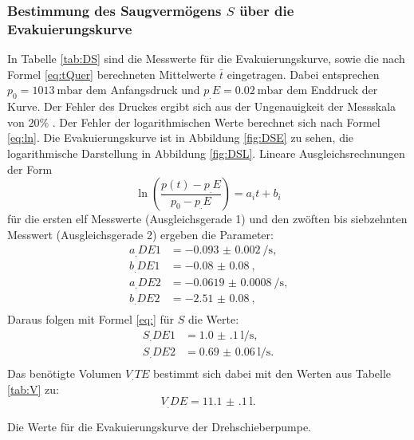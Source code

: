\subsubsection{Bestimmung des Saugvermögens $S$ über die Evakuierungskurve}

In Tabelle \ref{tab:DS} sind die Messwerte für die Evakuierungskurve, sowie die nach Formel \eqref{eq:tQuer} berechneten Mittelwerte $\bar{t}$ eingetragen.
Dabei entsprechen $p_0=\SI{1013}{\milli\bar}$ dem Anfangsdruck und $p_.E=\SI{0.02}{\milli\bar}$ dem Enddruck der Kurve. Der Fehler des Druckes ergibt sich aus der Ungenauigkeit der Messskala von $20\%$ \cite{V70}. 
Der Fehler der logarithmischen Werte berechnet sich nach Formel \eqref{eq:ln}.
Die Evakuierungskurve ist in Abbildung \ref{fig:DSE} zu sehen, die logarithmische Darstellung in Abbildung \ref{fig:DSL}.
Lineare Ausgleichsrechnungen der Form
\[
\ln\left(\frac{p(t)-p_.E}{p_0-p_.E}\right) = a_it+b_i
\]
für die ersten elf Messwerte (Ausgleichsgerade 1) und den zwöften bis siebzehnten Messwert (Ausgleichsgerade 2) ergeben die Parameter:
\begin{align*}
a_.{DE1} &= \SI{-0.093(2)}{\per\second} \text{,}\\
b_.{DE1} &= \SI{-0.08(8)}{} \text{,}\\
a_.{DE2} &= \SI{-0.0619(8)}{\per\second} \text{,}\\
b_.{DE2} &= \SI{-2.51(8)}{} \text{,}\\
\end{align*} 
Daraus folgen mit Formel \eqref{eq:} für $S$ die Werte:
\begin{align*}
S_.{DE1} &= \SI{1.0(1)}{\litre\per\second} \text{,}\\
S_.{DE2} &= \SI{0.69(6)}{\litre\per\second} \text{.}\\
\end{align*} 
Das benötigte Volumen $V_.{TE}$ bestimmt sich dabei mit den Werten aus Tabelle \ref{tab:V} zu:
\[
V_.{DE} = \SI{11.1(1)}{\litre}\text{.}
\]

\begin{table}
\centering
\caption{Die Werte für die Evakuierungskurve der Drehschieberpumpe.}

\label{tab:DS}
\end{table}

